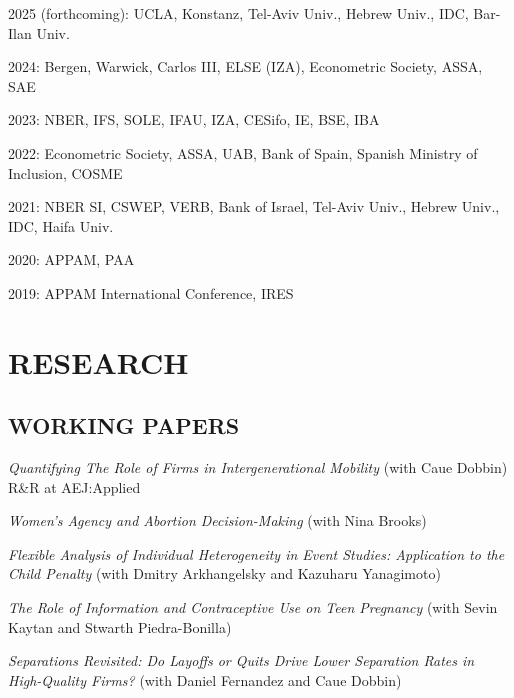 \documentclass[margin]{res} %
\newcommand{\rootFolder}{/Users/tomzohar/Dropbox/}
\begin{document}
\begin{resume}
 2025 (forthcoming): UCLA, Konstanz, Tel-Aviv Univ., Hebrew Univ., IDC, Bar-Ilan Univ.

 2024: Bergen, Warwick, Carlos III, ELSE (IZA), Econometric Society, ASSA, SAE

 2023: NBER, IFS, SOLE, IFAU, IZA, CESifo, IE, BSE, IBA

 2022: Econometric Society, ASSA, UAB, Bank of Spain, Spanish Ministry of Inclusion, COSME

 2021: NBER SI, CSWEP, VERB, Bank of Israel, Tel-Aviv Univ., Hebrew Univ., IDC, Haifa Univ.

 2020: APPAM, PAA

 2019: APPAM International Conference, IRES


\section{RESEARCH} 

\subsection{WORKING PAPERS}


\textit{Quantifying The Role of Firms in Intergenerational Mobility} (with Caue Dobbin) \\
R\&R at AEJ:Applied


\textit{Women's Agency and Abortion Decision-Making} (with Nina Brooks) 

%

\textit{Flexible Analysis of Individual Heterogeneity in Event Studies: Application to the Child Penalty} (with Dmitry Arkhangelsky and Kazuharu Yanagimoto)

\textit{The Role of Information and Contraceptive Use on Teen Pregnancy} (with Sevin Kaytan and Stwarth Piedra-Bonilla)

\textit{Separations Revisited: Do Layoffs or Quits Drive Lower Separation Rates in High-Quality Firms?} (with Daniel Fernandez and Caue Dobbin) 




\end{resume}
\end{document}
